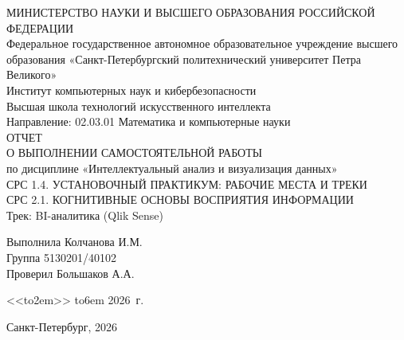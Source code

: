 \documentclass[12pt]{extreport}
\def\hrf#1{\hbox to#1{\hrulefill}}
\begin{document}
	\thispagestyle{empty}
	\centering
	МИНИСТЕРСТВО НАУКИ И ВЫСШЕГО ОБРАЗОВАНИЯ РОССИЙСКОЙ ФЕДЕРАЦИИ\\
	Федеральное государственное автономное образовательное учреждение высшего образования «Санкт-Петербургский политехнический университет Петра Великого»\\[10pt]
	Институт компьютерных наук и кибербезопасности\\
	Высшая школа технологий искусственного интеллекта\\
	Направление: 02.03.01 Математика и компьютерные науки\\
	\vspace{\fill}
	{\large
		ОТЧЕТ\\
		О ВЫПОЛНЕНИИ САМОСТОЯТЕЛЬНОЙ РАБОТЫ\\
		по дисциплине «Интеллектуальный анализ и визуализация данных»\\
		[20pt]
		СРС 1.4. УСТАНОВОЧНЫЙ ПРАКТИКУМ: РАБОЧИЕ МЕСТА И ТРЕКИ\\
		СРС 2.1. КОГНИТИВНЫЕ ОСНОВЫ ВОСПРИЯТИЯ ИНФОРМАЦИИ\\[10pt]
		Трек: BI-аналитика (Qlik Sense)\\
		\vspace{\fill}
	}
	
	\begin{flushleft}
		{
			{Выполнила}\hfill \hspace{5em} Колчанова И.М.\\
			Группа \hfill \hspace{5em} 5130201/40102 \\[20pt]
			{Проверил}\hfill \hspace{5em} Большаков А.А.\\
		}
	\end{flushleft}
	
	\begin{flushright}
		{<<\hrf{2em}>> \hrf{6em} 2026~г.}
	\end{flushright}
	
	\centering
	Санкт-Петербург, 2026
	
	\newpage
	
	\justifying
	\renewcommand\contentsname{\vspace{-3.2cm}\Large СОДЕРЖАНИЕ}
	\tableofcontents
	\thispagestyle{empty}
	\newpage
	
\end{document}

